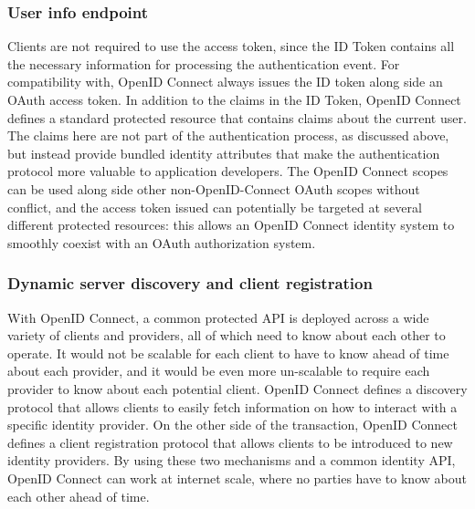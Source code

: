 \documentclass[a4paper, 10pt, titlepage]{article}
\begin{document}
\subsubsection{User info endpoint}
Clients are not required to use the access token, since the ID Token contains all the necessary information for processing the authentication event. For compatibility with, OpenID Connect always issues the ID token along side an OAuth access token.
In addition to the claims in the ID Token, OpenID Connect defines a standard protected resource that contains claims about the current user. The claims here are not part of the authentication process, as discussed above, but instead provide bundled identity attributes that make the authentication protocol more valuable to application developers. The OpenID Connect scopes can be used along side other non-OpenID-Connect OAuth scopes without conflict, and the access token issued can potentially be targeted at several different protected resources: this allows an OpenID Connect identity system to smoothly coexist with an OAuth authorization system.

\subsubsection{Dynamic server discovery and client registration}
With OpenID Connect, a common protected API is deployed across a wide variety of clients and providers, all of which need to know about each other to operate. It would not be scalable for each client to have to know ahead of time about each provider, and it would be even more un-scalable to require each provider to know about each potential client. OpenID Connect defines a discovery protocol that allows clients to easily fetch information on how to interact with a specific identity provider. On the other side of the transaction, OpenID Connect defines a client registration protocol that allows clients to be introduced to new identity providers. By using these two mechanisms and a common identity API, OpenID Connect can work at internet scale, where no parties have to know about each other ahead of time.
\end{document}
